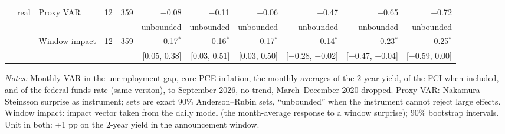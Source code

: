 \begin{table}[tp]
{\begin{tabular}{lllcrrrrrrr}
 & real & Proxy VAR & 12 & 359 & $-$0.08 & $-$0.11 & $-$0.06 & $-$0.47 & $-$0.65 & $-$0.72\\
 & & & & & {\tiny unbounded} & {\tiny unbounded} & {\tiny unbounded} & {\tiny unbounded} & {\tiny unbounded} & {\tiny unbounded}\\
 &  & Window impact & 12 & 359 & 0.17$^{*}$ & 0.16$^{*}$ & 0.17$^{*}$ & $-$0.14$^{*}$ & $-$0.23$^{*}$ & $-$0.25$^{*}$\\
 & & & & & {\tiny [0.05, 0.38]} & {\tiny [0.03, 0.51]} & {\tiny [0.03, 0.50]} & {\tiny [$-$0.28, $-$0.02]} & {\tiny [$-$0.47, $-$0.04]} & {\tiny [$-$0.59, 0.00]}\\
\bottomrule\end{tabular}}
\begin{flushleft}\footnotesize\textit{Notes:} Monthly VAR in the unemployment gap, core PCE inflation, the monthly averages of the 2-year yield, of the FCI when included, and of the federal funds rate (same version), to September 2026, no trend, March--December 2020 dropped. Proxy VAR: Nakamura--Steinsson surprise as instrument; sets are exact 90\% Anderson--Rubin sets, ``unbounded'' when the instrument cannot reject large effects. Window impact: impact vector taken from the daily model (the month-average response to a window surprise); 90\% bootstrap intervals. Unit in both: +1 pp on the 2-year yield in the announcement window.\end{flushleft}
\end{table}
